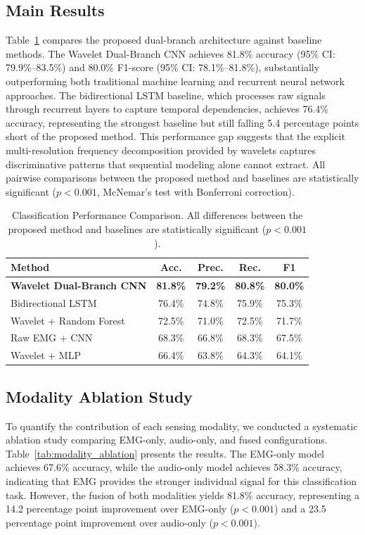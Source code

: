 \documentclass[acmtog, nonacm]{acmart}
\begin{document}
\subsection{Main Results}

Table~\ref{tab:results} compares the proposed dual-branch architecture against baseline methods. The Wavelet Dual-Branch CNN achieves 81.8\% accuracy (95\% CI: 79.9\%--83.5\%) and 80.0\% F1-score (95\% CI: 78.1\%--81.8\%), substantially outperforming both traditional machine learning and recurrent neural network approaches. The bidirectional LSTM baseline, which processes raw signals through recurrent layers to capture temporal dependencies, achieves 76.4\% accuracy, representing the strongest baseline but still falling 5.4 percentage points short of the proposed method. This performance gap suggests that the explicit multi-resolution frequency decomposition provided by wavelets captures discriminative patterns that sequential modeling alone cannot extract. All pairwise comparisons between the proposed method and baselines are statistically significant ($p < 0.001$, McNemar's test with Bonferroni correction).

\begin{table}[h]
  \caption{Classification Performance Comparison. All differences between the proposed method and baselines are statistically significant ($p < 0.001$).}
  \label{tab:results}
  \begin{tabular}{lcccc}
    \toprule
    Method & Acc. & Prec. & Rec. & F1 \\
    \midrule
    \textbf{Wavelet Dual-Branch CNN} & \textbf{81.8\%} & \textbf{79.2\%} & \textbf{80.8\%} & \textbf{80.0\%} \\
    Bidirectional LSTM & 76.4\% & 74.8\% & 75.9\% & 75.3\% \\
    Wavelet + Random Forest & 72.5\% & 71.0\% & 72.5\% & 71.7\% \\
    Raw EMG + CNN & 68.3\% & 66.8\% & 68.3\% & 67.5\% \\
    Wavelet + MLP & 66.4\% & 63.8\% & 64.3\% & 64.1\% \\
    \bottomrule
  \end{tabular}
\end{table}

\subsection{Modality Ablation Study}

To quantify the contribution of each sensing modality, we conducted a systematic ablation study comparing EMG-only, audio-only, and fused configurations. Table~\ref{tab:modality_ablation} presents the results. The EMG-only model achieves 67.6\% accuracy, while the audio-only model achieves 58.3\% accuracy, indicating that EMG provides the stronger individual signal for this classification task. However, the fusion of both modalities yields 81.8\% accuracy, representing a 14.2 percentage point improvement over EMG-only ($p < 0.001$) and a 23.5 percentage point improvement over audio-only ($p < 0.001$).
\end{document}
